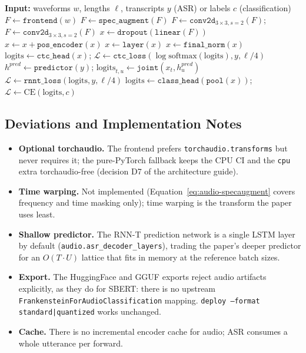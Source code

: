 \begin{algorithmic}[1]
\State \textbf{Input:} waveforms $w$, lengths $\ell$, transcripts $y$ (ASR) or labels $c$ (classification)
\State $F \gets \texttt{frontend}(w)$ 
\State $F \gets \texttt{spec\_augment}(F)$ 
\State $F \gets \texttt{conv2d}_{3\times3, s=2}(F)$; \quad $F \gets \texttt{conv2d}_{3\times3, s=2}(F)$
\State $x \gets \texttt{dropout}(\texttt{linear}(F))$ 
\State $x \gets x + \texttt{pos\_encoder}(x)$ 
    \State $x \gets \texttt{layer}(x)$ 
\EndFor
\State $x \gets \texttt{final\_norm}(x)$
    \State $\mathrm{logits} \gets \texttt{ctc\_head}(x)$; \quad $\mathcal{L} \gets \texttt{ctc\_loss}(\log\mathrm{softmax}(\mathrm{logits}), y, \ell/4)$
    \State $h^{pred} \gets \texttt{predictor}(y)$; \quad $\mathrm{logits}_{t,u} \gets \texttt{joint}(x_t, h^{pred}_u)$
    \State $\mathcal{L} \gets \texttt{rnnt\_loss}(\mathrm{logits}, y, \ell/4)$
\Else
    \State $\mathrm{logits} \gets \texttt{class\_head}(\texttt{pool}(x))$; \quad $\mathcal{L} \gets \mathrm{CE}(\mathrm{logits}, c)$
\EndIf
\end{algorithmic}

\subsection{Deviations and Implementation Notes}

\begin{itemize}[leftmargin=*]
    \item \textbf{Optional torchaudio.} The frontend prefers \texttt{torchaudio.transforms} but never requires it; the pure-PyTorch fallback keeps the CPU CI and the \texttt{cpu} extra torchaudio-free (decision D7 of the architecture guide).
    \item \textbf{Time warping.} Not implemented (Equation~\ref{eq:audio-specaugment} covers frequency and time masking only); time warping is the transform the paper uses least.
    \item \textbf{Shallow predictor.} The RNN-T prediction network is a single LSTM layer by default (\texttt{audio.asr\_decoder\_layers}), trading the paper's deeper predictor for an $O(T \cdot U)$ lattice that fits in memory at the reference batch sizes.
    \item \textbf{Export.} The HuggingFace and GGUF exports reject audio artifacts explicitly, as they do for SBERT: there is no upstream \texttt{FrankensteinForAudioClassification} mapping. \texttt{deploy --format standard|quantized} works unchanged.
    \item \textbf{Cache.} There is no incremental encoder cache for audio; ASR consumes a whole utterance per forward.
\end{itemize}
